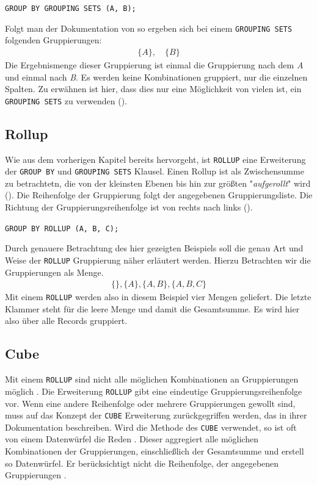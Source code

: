 \texttt{GROUP BY GROUPING SETS (A, B);}

Folgt man der Dokumentation von \cite{oracle16} so ergeben sich bei einem
\texttt{GROUPING SETS} folgenden Gruppierungen:
\begin{align*}
	\{A\}, \quad \{B\}
\end{align*}
Die Ergebnismenge dieser Gruppierung ist einmal die Gruppierung nach dem \textit{A}
und einmal nach \textit{B}. Es werden keine Kombinationen gruppiert, nur die
einzelnen Spalten. Zu erwähnen ist hier, dass dies nur eine Möglichkeit von
vielen ist, ein \texttt{GROUPING SETS} zu verwenden (\cite{oracle16}).

\subsection{Rollup}
Wie aus dem vorherigen Kapitel bereits hervorgeht, ist \texttt{ROLLUP} eine
Erweiterung der \texttt{GROUP BY} und \texttt{GROUPING SETS} Klausel. Einen Rollup
ist als Zwischensumme zu betrachtetn, die von der kleinsten Ebenen bis hin zur
größten "\textit{aufgerollt}" wird (\cite{oracle16}). Die Reihenfolge der
Gruppierung folgt der angegebenen Gruppierungsliste. Die Richtung der Gruppierungsreihenfolge
ist von rechts nach links (\cite{oracle16}).

\texttt{GROUP BY ROLLUP (A, B, C);}

Durch genauere Betrachtung des hier gezeigten Beispiels soll die genau Art und Weise
der \texttt{ROLLUP} Gruppierung näher erläutert werden. Hierzu Betrachten wir die
Gruppierungen als Menge.
\begin{align*}
	\{ \}, \{A\}, \{A, B\}, \{A, B, C\}
\end{align*}
Mit einem \texttt{ROLLUP} werden also in diesem Beispiel vier Mengen geliefert.
Die letzte Klammer steht für die leere Menge und damit die Gesamtsumme. Es wird hier
also über alle Records gruppiert.

\subsection{Cube}
Mit einem \texttt{ROLLUP} sind nicht alle möglichen Kombinationen an
Gruppierungen möglich \citep{oracle99}. Die Erweiterung \texttt{ROLLUP} gibt eine
eindeutige Gruppierungsreihenfolge vor. Wenn eine andere Reihenfolge oder
mehrere Gruppierungen gewollt sind, muss auf das Konzept der \texttt{CUBE}
Erweiterung zurückgegriffen werden, das \citet{oracle99} in ihrer Dokumentation
beschreiben. Wird die Methode des \texttt{CUBE} verwendet, so ist oft von einem Datenwürfel
die Reden \citep{oracle99}. Dieser aggregiert alle möglichen Kombinationen der Gruppierungen,
einschließlich der Gesamtsumme und erstell so Datenwürfel. Er berücksichtigt nicht
die Reihenfolge, der angegebenen Gruppierungen \citep{oracle99}.

